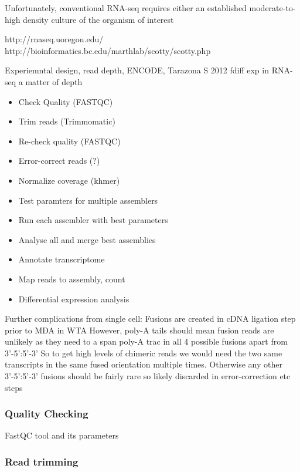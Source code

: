 Unfortunately, conventional RNA-seq requires either an established moderate-to-high
density culture of the organism of interest 








http://rnaseq.uoregon.edu/
http://bioinformatics.bc.edu/marthlab/scotty/scotty.php

Experiemntal design, read depth, ENCODE, Tarazona S 2012 fdiff exp in RNA-seq
a matter of depth

\begin{itemize}
    \item Check Quality (FASTQC)
    \item Trim reads (Trimmomatic)
    \item Re-check quality (FASTQC)
    \item Error-correct reads (?)
    \item Normalize coverage (khmer)
    \item Test paramters for multiple assemblers
    \item Run each assembler with best parameters
    \item Analyse all and merge best assemblies
    \item Annotate transcriptome
    \item Map reads to assembly, count
    \item Differential expression analysis
\end{itemize}










Further complications from single cell:
Fusions are created in cDNA ligation step prior to MDA in WTA
However, poly-A tails should mean fusion reads are unlikely as they need to a
span poly-A trac in all 4 possible fusions apart from 3'-5':5'-3'
So to get high levels of chimeric reads we would need the two same transcripts
in the same fused orientation multiple times.  Otherwise any other 3'-5':5'-3'
fusions should be fairly rare so likely discarded in error-correction etc steps

\subsubsection{Quality Checking}

FastQC tool and its parameters

\subsubsection{Read trimming}

